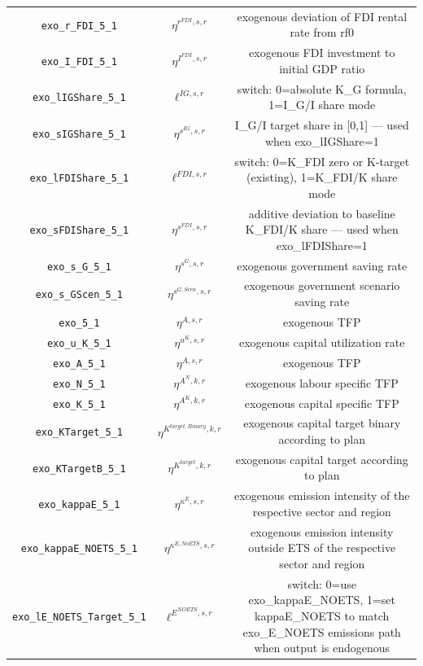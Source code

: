 \begin{center}
\begin{longtable}{ccc}
\texttt{exo\_r\_FDI\_5\_1} & ${\eta^{r^{FDI},s,r}}$ & exogenous deviation of FDI rental rate from rf0\\
\texttt{exo\_I\_FDI\_5\_1} & ${\eta^{I^{FDI},s,r}}$ & exogenous FDI investment to initial GDP ratio\\
\texttt{exo\_lIGShare\_5\_1} & ${\ell^{IG,s,r}}$ & switch: 0=absolute K\_G formula, 1=I\_G/I share mode\\
\texttt{exo\_sIGShare\_5\_1} & ${\eta^{s^{IG},s,r}}$ & I\_G/I target share in [0,1] — used when exo\_lIGShare=1\\
\texttt{exo\_lFDIShare\_5\_1} & ${\ell^{FDI,s,r}}$ & switch: 0=K\_FDI zero or K-target (existing), 1=K\_FDI/K share mode\\
\texttt{exo\_sFDIShare\_5\_1} & ${\eta^{s^{FDI},s,r}}$ & additive deviation to baseline K\_FDI/K share — used when exo\_lFDIShare=1\\
\texttt{exo\_s\_G\_5\_1} & ${\eta^{s^G,s,r}}$ & exogenous government saving rate\\
\texttt{exo\_s\_GScen\_5\_1} & ${\eta^{s^{G,Scen},s,r}}$ & exogenous government scenario saving rate\\
\texttt{exo\_5\_1} & ${\eta^{A,s,r}}$ & exogenous TFP\\
\texttt{exo\_u\_K\_5\_1} & ${\eta^{u^K,s,r}}$ & exogenous capital utilization rate\\
\texttt{exo\_A\_5\_1} & ${\eta^{A,s,r}}$ & exogenous TFP\\
\texttt{exo\_N\_5\_1} & ${\eta^{A^{N},k,r}}$ & exogenous labour specific TFP\\
\texttt{exo\_K\_5\_1} & ${\eta^{A^{K},k,r}}$ & exogenous capital specific TFP\\
\texttt{exo\_KTarget\_5\_1} & ${\eta^{K^{target,Binary},k,r}}$ & exogenous capital target binary according to plan\\
\texttt{exo\_KTargetB\_5\_1} & ${\eta^{K^{target},k,r}}$ & exogenous capital target according to plan\\
\texttt{exo\_kappaE\_5\_1} & ${\eta^{\kappa^{E},s,r}}$ & exogenous emission intensity of the respective sector and region\\
\texttt{exo\_kappaE\_NOETS\_5\_1} & ${\eta^{\kappa^{E,No ETS},s,r}}$ & exogenous emission intensity outside ETS of the respective sector and region\\
\texttt{exo\_lE\_NOETS\_Target\_5\_1} & ${\ell^{E^{NOETS},s,r}}$ & switch: 0=use exo\_kappaE\_NOETS, 1=set kappaE\_NOETS to match exo\_E\_NOETS emissions path when output is endogenous\\

\end{longtable}
\end{center}
